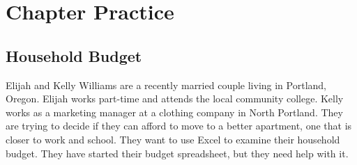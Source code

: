 \section{Chapter Practice}

\subsection{Household Budget}

Elijah and Kelly Williams are a recently married couple living in Portland, Oregon. Elijah works part-time and attends the local community college. Kelly works as a marketing manager at a clothing company in North Portland. They are trying to decide if they can afford to move to a better apartment, one that is closer to work and school. They want to use Excel to examine their household budget. They have started their budget spreadsheet, but they need help with it.


